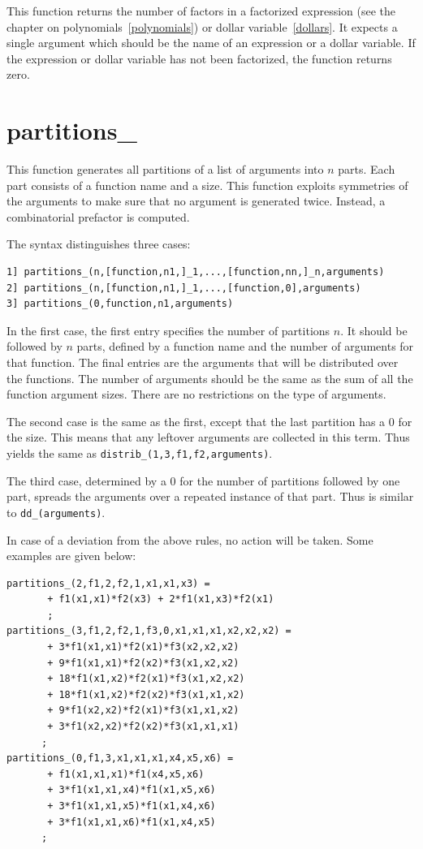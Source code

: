 \noindent This function returns the number of factors in a factorized 
expression (see the chapter on polynomials~\ref{polynomials}) or dollar 
variable~\ref{dollars}. It expects a single argument which should be the 
name of an expression or a dollar variable. If the expression or dollar 
variable has not been factorized, the function returns zero.


\section{partitions\_}
\label{funpartitions}
\noindent This function generates all partitions of a list of arguments into
$n$ parts. Each part consists of a function name and a size.
This function exploits symmetries of the arguments to make sure that no argument
is generated twice. Instead, a combinatorial prefactor is computed.

The syntax distinguishes three cases:
\begin{verbatim}
1] partitions_(n,[function,n1,]_1,...,[function,nn,]_n,arguments)
2] partitions_(n,[function,n1,]_1,...,[function,0],arguments)
3] partitions_(0,function,n1,arguments)
\end{verbatim}
In the first case, the first entry specifies the number of partitions $n$.
It should be followed by $n$ parts, defined by a function name
and the number of arguments for that function. The final entries are the arguments
that will be distributed over the functions.
The number of arguments should be the same as the sum of
all the function argument sizes.
There are no restrictions on the type of arguments.

The second case is the same as the first, except that the last partition
has a 0 for the size. This means that any leftover arguments are collected
in this term. Thus  yields the same
as \texttt{distrib\_(1,3,f1,f2,arguments)}.

The third case, determined by a 0 for the number of partitions followed by one part, spreads
the arguments over a repeated instance of that part. Thus  is similar to \texttt{dd\_(arguments)}.

In case of a deviation from the above rules, no action will be taken.
Some examples are given below:
\begin{verbatim}
partitions_(2,f1,2,f2,1,x1,x1,x3) =
       + f1(x1,x1)*f2(x3) + 2*f1(x1,x3)*f2(x1)
       ;
partitions_(3,f1,2,f2,1,f3,0,x1,x1,x1,x2,x2,x2) =
       + 3*f1(x1,x1)*f2(x1)*f3(x2,x2,x2)
       + 9*f1(x1,x1)*f2(x2)*f3(x1,x2,x2)
       + 18*f1(x1,x2)*f2(x1)*f3(x1,x2,x2)
       + 18*f1(x1,x2)*f2(x2)*f3(x1,x1,x2)
       + 9*f1(x2,x2)*f2(x1)*f3(x1,x1,x2)
       + 3*f1(x2,x2)*f2(x2)*f3(x1,x1,x1)
      ;
partitions_(0,f1,3,x1,x1,x1,x4,x5,x6) =
       + f1(x1,x1,x1)*f1(x4,x5,x6)
       + 3*f1(x1,x1,x4)*f1(x1,x5,x6)
       + 3*f1(x1,x1,x5)*f1(x1,x4,x6)
       + 3*f1(x1,x1,x6)*f1(x1,x4,x5)
      ;
\end{verbatim}


